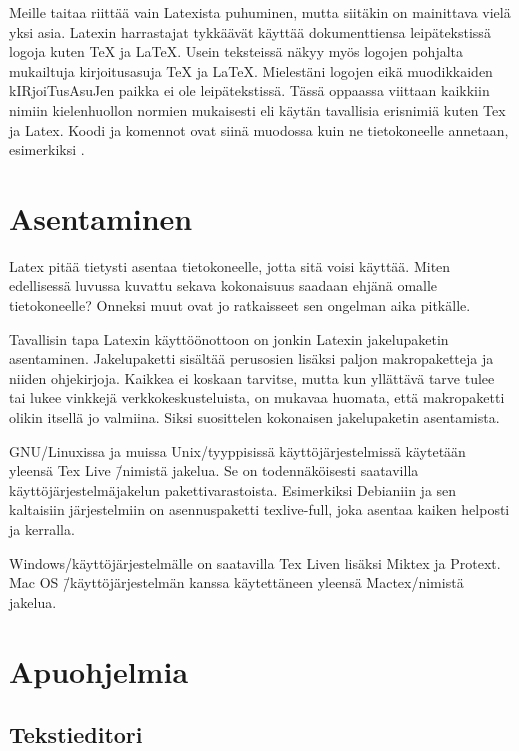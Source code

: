 Meille taitaa riittää vain Latexista puhuminen, mutta siitäkin on
mainittava vielä yksi asia. Latexin harrastajat tykkäävät käyttää
dokumenttiensa leipätekstissä logoja kuten \TeX{} ja \LaTeX{}. Usein
teksteissä näkyy myös logojen pohjalta mukailtuja kir\-joi\-tus\-asu\-ja
TeX ja LaTeX. Mielestäni logojen eikä muodikkaiden
kIR\-joi\-Tus\-Asu\-Jen paikka ei ole leipätekstissä. Tässä oppaassa
viittaan kaikkiin nimiin kielenhuollon normien mukaisesti eli käytän
tavallisia erisnimiä kuten Tex ja Latex. Koodi ja komennot ovat siinä
muodossa kuin ne tietokoneelle annetaan, esimerkiksi .

\section{Asentaminen}
\label{luku:asentaminen}

Latex pitää tietysti asentaa tietokoneelle, jotta sitä voisi käyttää.
Miten edellisessä luvussa kuvattu sekava kokonaisuus saadaan ehjänä
omalle tietokoneelle? Onneksi muut ovat jo ratkaisseet sen ongelman aika
pitkälle.

Tavallisin tapa Latexin käyttöönottoon on jonkin Latexin jakelupaketin
asentaminen. Jakelupaketti sisältää perusosien lisäksi paljon
makropaketteja ja niiden ohjekirjoja. Kaikkea ei koskaan tarvitse, mutta
kun yllättävä tarve tulee tai lukee vinkkejä verkkokeskusteluista, on
mukavaa huomata, että makropaketti olikin itsellä jo valmiina. Siksi
suosittelen kokonaisen jakelupaketin asentamista.

GNU/Linuxissa ja muissa Unix\-/tyyppisissä käyttöjärjestelmissä
käytetään yleensä Tex Live \=/nimistä jakelua. Se on todennäköisesti
saatavilla käyttöjärjestelmäjakelun pakettivarastoista. Esimerkiksi
Debianiin ja sen kaltaisiin järjestelmiin on asennuspaketti
texlive-full, joka asentaa kaiken helposti ja kerralla.

Windows\-/käyttöjärjestelmälle on saatavilla Tex Liven lisäksi Miktex ja
Protext. Mac OS \=/käyttöjärjestelmän kanssa käytettäneen yleensä
Mactex\-/nimistä jakelua.

\section{Apuohjelmia}

\subsection{Tekstieditori}


